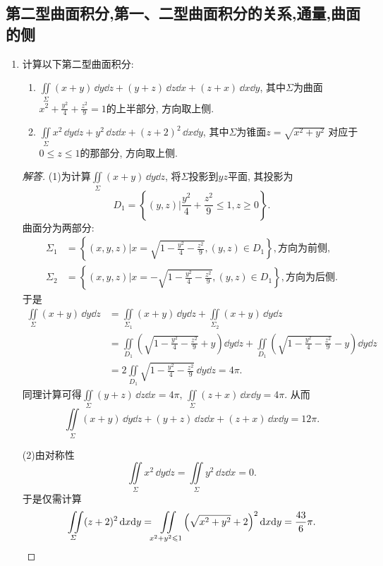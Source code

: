 \subsection{第二型曲面积分,第一、二型曲面积分的关系,通量,曲面的侧}
\begin{quiza}
\begin{enumerate}
\item 计算以下第二型曲面积分:
\begin{enumerate}[label=(\arabic*)]
\item  \(\iint\limits_{\varSigma}(x+y)\,\dd y\dd z+(y+z)\,\dd z\dd x+(z+x)\,\dd x\dd y\), 
其中\(\varSigma\)为曲面\(x^2+\frac{y^2}{4}+\frac{z^2}{9}=1\)的上半部分, 方向取上侧.
\item \(\iint\limits_{\varSigma}x^2\,\dd y\dd z+y^2\,\dd z\dd x+(z+2)^2\,\dd x\dd y\), 
其中\(\varSigma\)为锥面\(z=\sqrt{x^2+y^2}\)
对应于\(0\leqslant z\leqslant 1\)的那部分, 方向取上侧.
\end{enumerate}
\begin{proof}[解答]
(1)为计算\(\iint\limits_{\varSigma}(x+y)\,\dd y\dd z\), 将\(\varSigma\)投影到\(yz\)平面, 其投影为
\[D_1=\left\lbrace(y,z)\big|\frac{y^2}{4}+\frac{z^2}{9}\leqslant 1,z\geqslant 0\right\rbrace.\]
曲面分为两部分:\[\begin{split}
\varSigma_1&=\left\lbrace (x,y,z)\big|x=\sqrt{1-\frac{y^2}{4}-\frac{z^2}{9}},(y,z)\in D_1 \right\rbrace,\text{方向为前侧},\\
\varSigma_2&=\left\lbrace (x,y,z)\big|x=-\sqrt{1-\frac{y^2}{4}-\frac{z^2}{9}},(y,z)\in D_1 \right\rbrace,\text{方向为后侧}.
\end{split}\]于是\[\begin{split}
\iint\limits_{\varSigma}(x+y)\,\dd y\dd z
&=\iint\limits_{\varSigma_1}(x+y)\,\dd y\dd z+\iint\limits_{\varSigma_2}(x+y)\,\dd y\dd z\\
&=\iint\limits_{D_1}\left(\sqrt{1-\frac{y^2}{4}-\frac{z^2}{9}}+y\right)\dd y\dd z
+\iint\limits_{D_1}\left(\sqrt{1-\frac{y^2}{4}-\frac{z^2}{9}}-y\right)\dd y\dd z\\
&=2\iint\limits_{D_1}\sqrt{1-\frac{y^2}{4}-\frac{z^2}{9}}\,\dd y\dd z=4\pi.
\end{split}\]
同理计算可得\(\iint\limits_{\varSigma}(y+z)\,\dd z\dd x=4\pi,
\,\iint\limits_{\varSigma}(z+x)\,\dd x\dd y=4\pi\). 从而
\[\iint\limits_{\varSigma}(x+y)\,\dd y\dd z+(y+z)\,\dd z\dd x+(z+x)\,\dd x\dd y=12\pi.\]

(2)由对称性\[\iint\limits_{\varSigma}x^2\,\dd y\dd z
=\iint\limits_{\varSigma}y^2\,\dd z\dd x=0.\]
于是仅需计算\[\iint\limits_{\varSigma}(z+2)^2\,\mathrm{d} x\mathrm{d} y
=\iint\limits_{x^2+y^2\leqslant 1}\left(\sqrt{x^2+y^2}+2\right)^2\mathrm{d} x\mathrm{d} y
=\frac{43}{6}\pi.\qedhere\]
\end{proof}


\end{enumerate}
\end{quiza}
